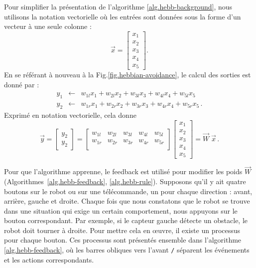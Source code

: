 Pour simplifier la présentation de l'algorithme \ref{alg.hebb-background}, nous utilisons la notation vectorielle où les entrées sont données sous la forme d'un vecteur à une seule colonne :
\[
\vec{x} = \left[ \begin{array}{c} x_1\\x_2\\x_3\\x_4\\x_5 \end{array} \right].
\]
En se référant à nouveau à la Fig.\ref{fig.hebbian-avoidance}, le calcul des sorties est donné par :
\begin{eqnarray}
y_1 & \leftarrow & w_{1l}x_1 + w_{2l}x_2 + w_{3l}x_3 + w_{4l}x_4 + w_{5l}x_5\label{eqn.yl}\\
y_2 & \leftarrow & w_{1r}x_1 + w_{2r}x_2 + w_{3r}x_3 + w_{4r}x_4 + w_{5r}x_5\label{eqn.yr}\,.
\end{eqnarray}
Exprimé en notation vectorielle, cela donne
\begin{equation}\label{eqn.hebbian}
\vec{y} =
\left[ \begin{array}{c} y_2\\y_2 \end{array} \right] =
\left[
  \begin{array}{ccccc}
    w_{1l} & w_{2l} & w_{3l} & w_{4l} & w_{5l} \\
    w_{1r} & w_{2r} & w_{3r} & w_{4r} & w_{5r} \\
\end{array}
\right]
\left[ \begin{array}{c} x_1\\x_2\\x_3\\x_4\\x_5 \end{array} \right] =
\vec{W}\;\vec{x}\,.
\end{equation}

Pour que l'algorithme apprenne, le feedback est utilisé pour modifier les poids $\vec{W}$ (Algorithmes~\ref{alg.hebb-feedback}, \ref{alg.hebb-rule}). Supposons qu'il y ait quatre boutons sur le robot ou sur une télécommande, un pour chaque direction : avant, arrière, gauche et droite. Chaque fois que nous constatons que le robot se trouve dans une situation qui exige un certain comportement, nous appuyons sur le bouton correspondant. Par exemple, si le capteur gauche détecte un obstacle, le robot doit tourner à droite. Pour mettre cela en œuvre, il existe un processus pour chaque bouton. Ces processus sont présentés ensemble dans l'algorithme \ref{alg.hebb-feedback}, où les barres obliques vers l'avant \verb+/+ séparent les événements et les actions correspondants.

